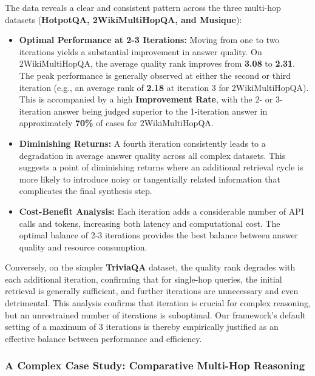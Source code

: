 \documentclass[11pt]{article}
\begin{document}
The data reveals a clear and consistent pattern across the three multi-hop datasets (\textbf{HotpotQA, 2WikiMultiHopQA, and Musique}):

\begin{itemize}
    \item \textbf{Optimal Performance at 2-3 Iterations:} Moving from one to two iterations yields a substantial improvement in answer quality. On 2WikiMultiHopQA, the average quality rank improves from \textbf{3.08} to \textbf{2.31}. The peak performance is generally observed at either the second or third iteration (e.g., an average rank of \textbf{2.18} at iteration 3 for 2WikiMultiHopQA). This is accompanied by a high \textbf{Improvement Rate}, with the 2- or 3-iteration answer being judged superior to the 1-iteration answer in approximately \textbf{70\%} of cases for 2WikiMultiHopQA.
    
    \item \textbf{Diminishing Returns:} A fourth iteration consistently leads to a degradation in average answer quality across all complex datasets. This suggests a point of diminishing returns where an additional retrieval cycle is more likely to introduce noisy or tangentially related information that complicates the final synthesis step.
    
    \item \textbf{Cost-Benefit Analysis:} Each iteration adds a considerable number of API calls and tokens, increasing both latency and computational cost. The optimal balance of 2-3 iterations provides the best balance between answer quality and resource consumption.
\end{itemize}

Conversely, on the simpler \textbf{TriviaQA} dataset, the quality rank degrades with each additional iteration, confirming that for single-hop queries, the initial retrieval is generally sufficient, and further iterations are unnecessary and even detrimental. This analysis confirms that iteration is crucial for complex reasoning, but an unrestrained number of iterations is suboptimal. Our framework's default setting of a maximum of 3 iterations is thereby empirically justified as an effective balance between performance and efficiency.

\subsubsection{A Complex Case Study: Comparative Multi-Hop Reasoning}
\end{document}
